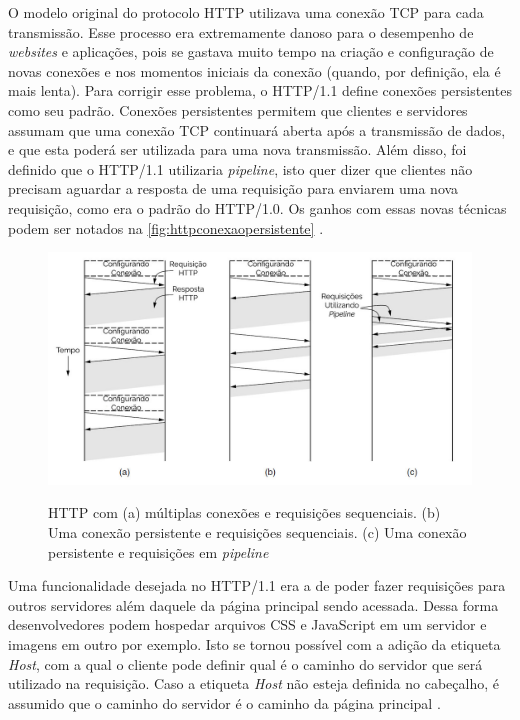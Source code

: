 O modelo original do protocolo HTTP utilizava uma conexão TCP para cada transmissão. Esse processo era extremamente danoso para o desempenho de \textit{websites} e aplicações, pois se gastava muito tempo na criação e configuração de novas conexões e nos momentos iniciais da conexão (quando, por definição, ela é mais lenta). Para corrigir esse problema, o HTTP/1.1 define conexões persistentes como seu padrão. Conexões persistentes permitem que clientes e servidores assumam que uma conexão TCP continuará aberta após a transmissão de dados, e que esta poderá ser utilizada para uma nova transmissão. Além disso, foi definido que o HTTP/1.1 utilizaria \textit{pipeline}, isto quer dizer que clientes não precisam aguardar a resposta de uma requisição para enviarem uma nova requisição, como era o padrão do HTTP/1.0. Os ganhos com essas novas técnicas podem ser notados na \autoref{fig:httpconexaopersistente} \cite{Tanenbaum}.

\begin{figure}[!htb]
    \centering
    \caption{HTTP com (a) múltiplas conexões e requisições sequenciais. (b) Uma conexão persistente e requisições sequenciais. (c) Uma conexão persistente e requisições em \textit{pipeline}}
    \includegraphics[width=1.0\textwidth]{./04-figuras/fund-teorica/httpconexaopersistente}
    \label{fig:httpconexaopersistente}
\end{figure}

Uma funcionalidade desejada no HTTP/1.1 era a de poder fazer requisições para outros servidores além daquele da página principal sendo acessada. Dessa forma desenvolvedores podem hospedar arquivos CSS e JavaScript em um servidor e imagens em outro por exemplo. Isto se tornou possível com a adição da etiqueta \textit{Host}, com a qual o cliente pode definir qual é o caminho do servidor que será utilizado na requisição. Caso a etiqueta \textit{Host} não esteja definida no cabeçalho, é assumido que o caminho do servidor é o caminho da página principal \cite{Tanenbaum}.

